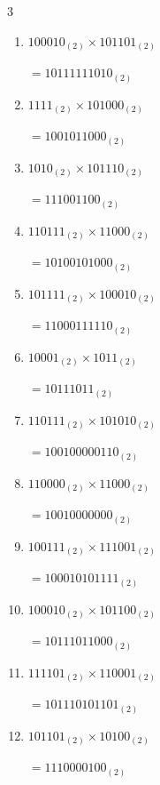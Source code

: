 \begin{multicols}{3}
\begin{enumerate}
        $=110010110_{(2)}$

  \item $100010_{(2)} \times 101101_{(2)}$

        $=10111111010_{(2)}$

\columnbreak %

  \item $1111_{(2)} \times 101000_{(2)}$

        $=1001011000_{(2)}$

  \item $1010_{(2)} \times 101110_{(2)}$

        $=111001100_{(2)}$

  \item $110111_{(2)} \times 11000_{(2)}$

        $=10100101000_{(2)}$

  \item $101111_{(2)} \times 100010_{(2)}$

        $=11000111110_{(2)}$

  \item $10001_{(2)} \times 1011_{(2)}$

        $=10111011_{(2)}$

\columnbreak %

\resetques

  \item $110111_{(2)} \times 101010_{(2)}$

        $=100100000110_{(2)}$

  \item $110000_{(2)} \times 11000_{(2)}$

        $=10010000000_{(2)}$

  \item $100111_{(2)} \times 111001_{(2)}$

        $=100010101111_{(2)}$

  \item $100010_{(2)} \times 101100_{(2)}$

        $=10111011000_{(2)}$

  \item $111101_{(2)} \times 110001_{(2)}$

        $=101110101101_{(2)}$

\columnbreak %

  \item $101101_{(2)} \times 10100_{(2)}$

        $=1110000100_{(2)}$


\end{enumerate}
\end{multicols}
